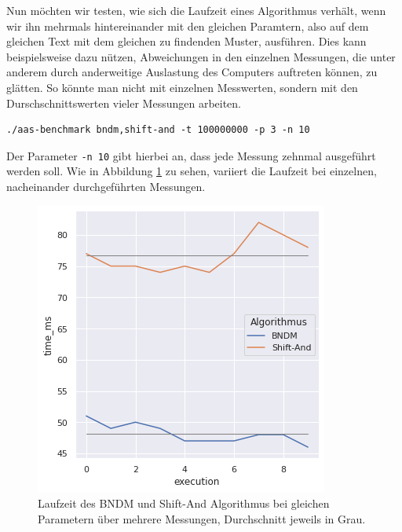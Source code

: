 \documentclass[twocolumn]{article}
\begin{document}
Nun möchten wir testen, wie sich die Laufzeit eines Algorithmus verhält, wenn wir ihn mehrmals hintereinander mit den gleichen Paramtern, also auf dem gleichen Text mit dem gleichen zu findenden Muster, ausführen. Dies kann beispielsweise dazu nützen, Abweichungen in den einzelnen Messungen, die unter anderem durch anderweitige Auslastung des Computers auftreten können, zu glätten. So könnte man nicht mit einzelnen Messwerten, sondern mit den Durschschnittswerten vieler Messungen arbeiten.

\begin{lstlisting}[breaklines=true,autogobble=true]
    ./aas-benchmark bndm,shift-and -t 100000000 -p 3 -n 10
\end{lstlisting}

Der Parameter \texttt{-n 10} gibt hierbei an, dass jede Messung zehnmal ausgeführt werden soll. Wie in Abbildung \ref{fig:runtime_bndm_shift_and} zu sehen, variiert die Laufzeit bei einzelnen, nacheinander durchgeführten Messungen.

\begin{figure}
    \includegraphics[width=\linewidth]{assets/graph_3.png}
    \caption{Laufzeit des BNDM und Shift-And Algorithmus bei gleichen Parametern über mehrere Messungen, Durchschnitt jeweils in Grau.}
    \label{fig:runtime_bndm_shift_and}
\end{figure}
\end{document}
